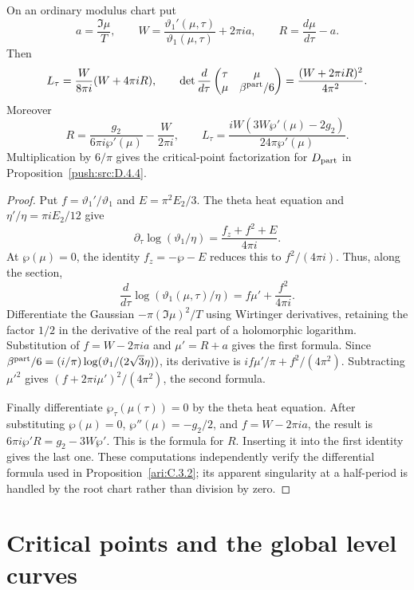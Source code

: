 \begin{proposition}\label{ari:C.8.11}
On an ordinary modulus chart put
\[
 a=\frac{\Im\mu}{T},\qquad
 W=\frac{\vartheta_1'(\mu,\tau)}{\vartheta_1(\mu,\tau)}
                         +2\pi ia,\qquad
 R=\frac{d\mu}{d\tau}-a.
\]
Then
\[
 L_\tau=\frac{W}{8\pi i}(W+4\pi iR),\qquad
 \det\frac{d}{d\tau}
 \begin{pmatrix}\tau&\mu\\\mu&\beta^{\rm part}/6\end{pmatrix}
       =\frac{(W+2\pi iR)^2}{4\pi^2}.
\]
Moreover
\[
 R=\frac{g_2}{6\pi i\wp'(\mu)}-\frac{W}{2\pi i},
 \qquad
 L_\tau=\frac{iW(3W\wp'(\mu)-2g_2)}
                         {24\pi\wp'(\mu)}.
\]
Multiplication by $6/\pi$ gives the critical-point factorization for
$D_{\rm part}$ in Proposition~\ref{push:src:D.4.4}.
\end{proposition}

\begin{proof}
Put $f=\vartheta_1'/\vartheta_1$ and
$E=\pi^2E_2/3$. The theta heat equation and
$\eta'/\eta=\pi iE_2/12$ give
\[
 \partial_\tau\log(\vartheta_1/\eta)
       =\frac{f_z+f^2+E}{4\pi i}.
\]
At $\wp(\mu)=0$, the identity $f_z=-\wp-E$ reduces
this to $f^2/(4\pi i)$. Thus, along the section,
\[
 \frac{d}{d\tau}\log(\vartheta_1(\mu,\tau)/\eta)
       =f\mu'+\frac{f^2}{4\pi i}.
\]
Differentiate the Gaussian $-\pi(\Im\mu)^2/T$ using
Wirtinger derivatives, retaining the factor $1/2$ in
the derivative of the real part of a holomorphic logarithm.
Substitution of $f=W-2\pi ia$ and $\mu'=R+a$ gives the
first formula. Since
$\beta^{\rm part}/6=(i/\pi)\log(\vartheta_1/(2\sqrt3\eta))$,
its derivative is $if\mu'/\pi+f^2/(4\pi^2)$.
Subtracting $\mu'^2$ gives
$(f+2\pi i\mu')^2/(4\pi^2)$, the second formula.

Finally differentiate $\wp_\tau(\mu(\tau))=0$ by the theta
heat equation. After substituting $\wp(\mu)=0$,
$\wp''(\mu)=-g_2/2$, and $f=W-2\pi ia$, the result is
$6\pi i\wp'R=g_2-3W\wp'$. This is the formula for $R$.
Inserting it into the first identity gives the last one.
These computations independently verify the differential formula used in Proposition~\ref{ari:C.3.2};
its apparent singularity at a half-period is
handled by the root chart rather than division by zero.
\end{proof}



\section{Critical points and the global level curves}

